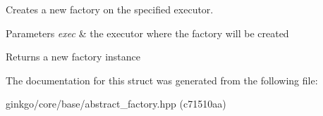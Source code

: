 Creates a new factory on the specified executor. 


\begin{DoxyParams}{Parameters}
{\em exec} & the executor where the factory will be created\\
\hline
\end{DoxyParams}
\begin{DoxyReturn}{Returns}
a new factory instance 
\end{DoxyReturn}


The documentation for this struct was generated from the following file\+:\begin{DoxyCompactItemize}
\item 
ginkgo/core/base/abstract\+\_\+factory.\+hpp (c71510aa)\end{DoxyCompactItemize}
